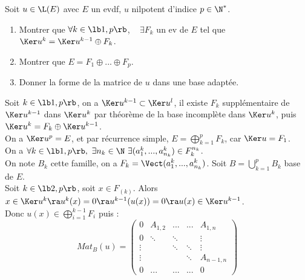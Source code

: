 \documentclass[11pt]{article}
\begin{document}
\begin{exercice}{}{}
    Soit $u\in\L(E)$ avec $E$ un evdf, $u$ nilpotent d'indice $p\in\N^*$.
    \begin{enumerate}
        \item Montrer que $\forall k \in \lb1,p\rb$, ~ $\exists F_k$ un ev de $E$ tel que $\Ker u^k = \Ker u^{k-1}\oplus F_k$.
        \item Montrer que $E=F_1\oplus ... \oplus F_p$.
        \item Donner la forme de la matrice de $u$ dans une base adaptée.
    \end{enumerate} 
    \tcblower
     Soit $k\in\lb1,p\rb$, on a $\Ker u^{k-1} \subset \Ker u^l$, il existe $F_k$ supplémentaire de $\Ker u^{k-1}$ dans $\Ker u^k$ par théorème de la base incomplète dans $\Ker u^k$, puis $\Ker u^k = F_k \oplus \Ker u^{k-1}$.\\
     On a $\Ker u^p = E$, et par récurrence simple, $E=\bigoplus_{k=1}^pF_k$, car $\Ker u = F_1$.\\
     On a $\forall k \in \lb1,p\rb, ~ \exists n_k \in \N ~ \exists (a_1^k, ..., a_{n_k}^k)\in F_k^{n_k}$.\\
    On note $B_k$ cette famille, on a $F_k=\Vect(a_1^k, ..., a_{n_k}^k)$. Soit $B=\bigcup_{k=1}^p B_k$ base de $E$.\\
    Soit $k\in\lb2,p\rb$, soit $x\in F_(k)$. Alors $x\in \Ker u^k \ra u^k(x)=0\ra u^{k-1}(u(x))=0\ra u(x)\in\Ker u^{k-1}$.\\
    Donc $u(x)\in\bigoplus_{i=1}^{k-1}F_i$ puis :
    \begin{equation*}
        Mat_B(u) = \begin{pmatrix}
            0 & A_{1,2} & ... & ... & A_{1,n} \\
            0 & \ddots & \ddots & & \vdots \\
            \vdots & & \ddots & \ddots & \vdots \\
            \vdots & & & \ddots & A_{n-1,n} \\
            0 & ... & ... & ... & 0
        \end{pmatrix}
    \end{equation*}
\end{exercice}

\vspace*{-0.8cm}
\end{document}
